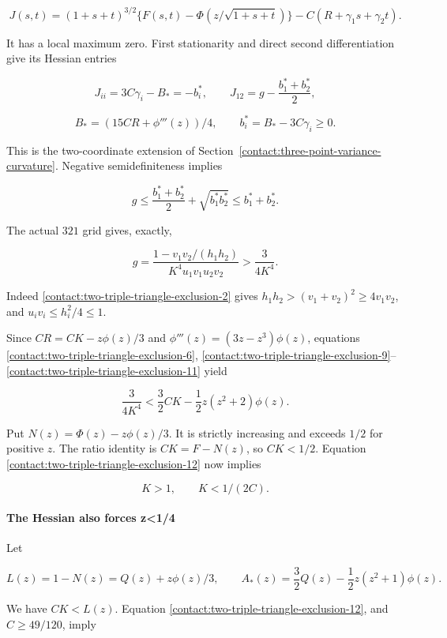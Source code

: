\[
 J(s,t)=(1+s+t)^{3/2}
 \{F(s,t)-\Phi(z/\sqrt{1+s+t})\}
 -C(R+\gamma_1s+\gamma_2t).
\]

It has a local maximum zero. First stationarity and direct second
differentiation give its Hessian entries

\[
 J_{ii}=3C\gamma_i-B_*=-b_i^*,\qquad
 J_{12}=g-\frac{b_1^*+b_2^*}{2},
\]

\[
 B_*=(15CR+\phi'''(z))/4,\qquad b_i^*=B_*-3C\gamma_i\geq0.
\tag{B.20.9}\label{contact:two-triple-triangle-exclusion-9}
\]

This is the two-coordinate extension of
Section~\ref{contact:three-point-variance-curvature}.
Negative semidefiniteness implies

\[
 g\leq\frac{b_1^*+b_2^*}{2}+\sqrt{b_1^*b_2^*}
 \leq b_1^*+b_2^*.
\tag{B.20.10}\label{contact:two-triple-triangle-exclusion-10}
\]

The actual $321$ grid gives, exactly,

\[
 g=\frac{1-v_1v_2/(h_1h_2)}{K^4u_1v_1u_2v_2}
   >\frac3{4K^4}.
\tag{B.20.11}\label{contact:two-triple-triangle-exclusion-11}
\]

Indeed \eqref{contact:two-triple-triangle-exclusion-2} gives $h_1h_2>(v_1+v_2)^2\ge 4v_1v_2$, and
$u_iv_i\le h_i^2/4\le 1$.

Since $CR=CK-z \phi(z)/3$ and $\phi'''(z)=(3z-z^3)\phi(z)$, equations
\eqref{contact:two-triple-triangle-exclusion-6}, \eqref{contact:two-triple-triangle-exclusion-9}--\eqref{contact:two-triple-triangle-exclusion-11} yield

\[
 \frac3{4K^4}
 <\frac32CK-\frac12z(z^2+2)\phi(z).
\tag{B.20.12}\label{contact:two-triple-triangle-exclusion-12}
\]

Put $N(z)=\Phi(z)-z \phi(z)/3$. It is strictly increasing and exceeds
$1/2$ for positive $z$. The ratio identity is $CK=F-N(z)$, so $CK<1/2$.
Equation \eqref{contact:two-triple-triangle-exclusion-12} now implies

\[
 \boxed{\quad K>1,\qquad K<1/(2C).\quad}
\tag{B.20.13}\label{contact:two-triple-triangle-exclusion-13}
\]

\paragraph{The Hessian also forces z<1/4}

Let

\[
 L(z)=1-N(z)=Q(z)+z\phi(z)/3,
 \qquad
 A_*(z)=\frac32Q(z)-\frac12z(z^2+1)\phi(z).
\]

We have $CK<L(z)$. Equation \eqref{contact:two-triple-triangle-exclusion-12}, and $C\ge49/120$, imply

